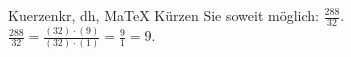 \begin{MAufgabe}{Kuerzen}{kr, dh, MaTeX}
K\"urzen Sie soweit m\"oglich: $\frac{288}{32}$.\\ 
\ifLsg\MLoesung
\quad $\frac{288}{32}=\frac{(32)\cdot(9)}{(32)\cdot(1)}=\frac{9}{1}=9$.\else\relax\fi
 \end{MAufgabe}